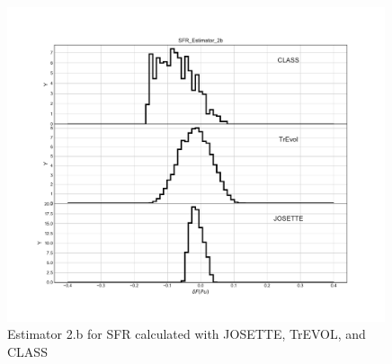 \begin{figure}[h]
	\begin{center}
		\includegraphics[width = 0.99\textwidth]{../../Feature_1/RAW_DATA/FIG/SFR_Estimator_2b.pdf}
		\caption{Estimator 2.b for SFR calculated with JOSETTE, TrEVOL, and CLASS}
		\label{fig:Est2_SFR}
	\end{center}
\end{figure}
